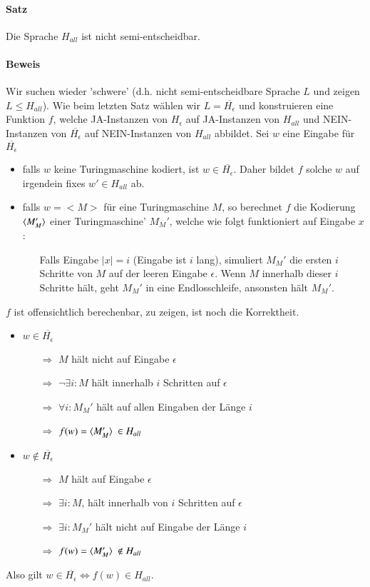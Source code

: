 \paragraph*{Satz} Die Sprache $H_{all}$ ist nicht semi-entscheidbar.

\paragraph*{Beweis} Wir suchen wieder 'schwere' (d.h. nicht semi-entscheidbare Sprache $L$ und zeigen $L \leq H_{all}$). Wie beim letzten Satz wählen wir $L=\overline{H_\epsilon}$ und konstruieren eine Funktion $f$, welche JA-Instanzen von $H_\epsilon$ auf JA-Instanzen von $H_{all}$ und NEIN-Instanzen von $\overline{H_\epsilon}$ auf NEIN-Instanzen von $H_{all}$ abbildet.
Sei $w$ eine Eingabe für $\overline{H_\epsilon}$
\begin{itemize}
	\item falls $w$ keine Turingmaschine kodiert, ist $w \in \overline{H_\epsilon}$. Daher bildet $f$ solche $w$ auf irgendein fixes $w' \in H_{all}$ ab.
	\item falls $w=<M>$ für eine Turingmaschine $M$, so berechnet $f$ die Kodierung $\langle M_M' \rangle$ einer Turingmaschine' $M_M'$, welche wie folgt funktioniert auf Eingabe $x$:
	\begin{itemize}
		\item[] Falls Eingabe $|x|=i$ (Eingabe ist $i$ lang), simuliert $M_M'$ die ersten $i$ Schritte von $M$ auf der leeren Eingabe $\epsilon$. Wenn $M$ innerhalb dieser $i$ Schritte hält, geht $M_M'$ in eine Endlosschleife, ansonsten hält $M_M'$.
	\end{itemize}
\end{itemize}
$f$ ist offensichtlich berechenbar, zu zeigen, ist noch die Korrektheit.
\begin{itemize}
	\item $w \in \overline{H_\epsilon}$
	\begin{itemize}
		\item[$\Rightarrow$] $M$ hält nicht auf Eingabe $\epsilon$
		\item[$\Rightarrow$] $\lnot\exists i : M$ hält innerhalb $i$ Schritten auf $\epsilon$
		\item[$\Rightarrow$] $\forall i : M_M'$ hält auf allen Eingaben der Länge $i$
		\item[$\Rightarrow$] $f(w)=\langle M_M' \rangle\ \in H_{all}$
	\end{itemize}
	\item $w \not\in \overline{H_\epsilon}$
	\begin{itemize}
		\item[$\Rightarrow$] $M$ hält auf Eingabe $\epsilon$
		\item[$\Rightarrow$] $\exists i : M$, hält innerhalb von $i$ Schritten auf $\epsilon$
		\item[$\Rightarrow$] $\exists i : M_M'$ hält nicht auf Eingabe der Länge $i$
		\item[$\Rightarrow$] $f(w)=\langle M_M' \rangle\ \not \in H_{all}$
	\end{itemize}
\end{itemize}
Also gilt $w \in \overline{H_\epsilon} \Leftrightarrow f(w) \in H_{all}$.

